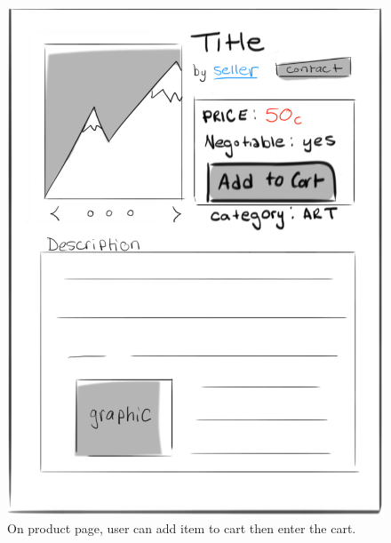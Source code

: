 \documentclass[]{article}
\begin{document}
\begin{enumerate}
		\begin{figure}
		  \includegraphics[width=\linewidth]{./pictures/product.png}
		  \caption{On product page, user can add item to cart then enter the cart.}
		  \label{fig:buyer3}
		\end{figure}
		

\end{enumerate}
\end{document}
